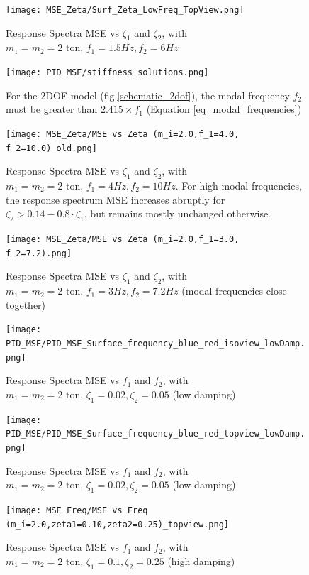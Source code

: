 \documentclass[9pt]{extarticle}
\begin{document}
\begin{figure}[H]
\begin{minipage}{0.45\textwidth}
    \centering
    \texttt{[image: MSE\_Zeta/Surf\_Zeta\_LowFreq\_TopView.png]}
    \caption{Response Spectra MSE vs $\zeta_1$ and $\zeta_2$, with $m_1=m_2=2\text{ ton, }f_1=1.5 Hz, f_2=6 Hz$}
\end{minipage}
\hfill
\begin{minipage}{0.45\textwidth}
    \centering
    \texttt{[image: PID\_MSE/stiffness\_solutions.png]}
    \caption{For the 2DOF model (fig.\ref{schematic_2dof}), the modal frequency $f_2$ must be greater than $2.415 \times f_1$  (Equation \ref{eq_modal_frequencies})}
    \label{fig_close_modal_freqs}
\end{minipage}
\end{figure}

\begin{figure}[H]
\begin{minipage}{0.45\textwidth}
    \centering
    \texttt{[image: MSE\_Zeta/MSE vs Zeta (m\_i=2.0,f\_1=4.0, f\_2=10.0)\_old.png]}
    \caption{Response Spectra MSE vs $\zeta_1$ and $\zeta_2$, with $m_1=m_2=2\text{ ton, }f_1=4 Hz, f_2=10 Hz$. For high modal frequencies, the response spectrum MSE increases abruptly for $\zeta_2 > 0.14 - 0.8\cdot \zeta_1 $, but remains mostly unchanged otherwise.}
\end{minipage}
\hfill
\begin{minipage}{0.45\textwidth}
    \centering
    \texttt{[image: MSE\_Zeta/MSE vs Zeta (m\_i=2.0,f\_1=3.0, f\_2=7.2).png]}
    \caption{Response Spectra MSE vs $\zeta_1$ and $\zeta_2$, with $m_1=m_2=2\text{ ton, }f_1=3 Hz, f_2=7.2 Hz$ (modal frequencies close together)}
\end{minipage}
\end{figure}


\begin{figure}[H]
    \centering
    \texttt{[image: PID\_MSE/PID\_MSE\_Surface\_frequency\_blue\_red\_isoview\_lowDamp.png]}
    \caption{Response Spectra MSE vs $f_1$ and $f_2$, with $m_1=m_2=2\text{ ton, } \zeta_1=0.02, \zeta_2=0.05$ (low damping)}
\end{figure}


\begin{figure}[H]
\begin{minipage}{0.44\textwidth}
    \centering
    \texttt{[image: PID\_MSE/PID\_MSE\_Surface\_frequency\_blue\_red\_topview\_lowDamp.png]}
    \caption{Response Spectra MSE vs $f_1$ and $f_2$, with $m_1=m_2=2\text{ ton, } \zeta_1=0.02, \zeta_2=0.05$ (low damping)}
\end{minipage}
\hfill
\begin{minipage}{0.45\textwidth}
    \centering
    \texttt{[image: MSE\_Freq/MSE vs Freq (m\_i=2.0,zeta1=0.10,zeta2=0.25)\_topview.png]}
    \caption{Response Spectra MSE vs $f_1$ and $f_2$, with $m_1=m_2=2\text{ ton, } \zeta_1=0.1, \zeta_2=0.25$ (high damping)}
\end{minipage}
\end{figure}
\end{document}
